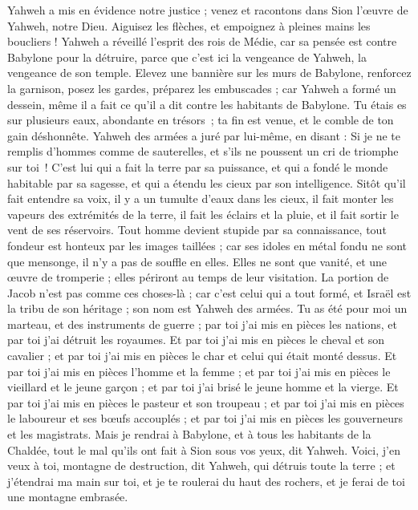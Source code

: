 \begin{multicols}{2}
Yahweh a mis en évidence notre justice ; venez et racontons dans Sion l’œuvre de Yahweh, notre Dieu.
Aiguisez les flèches, et empoignez à pleines mains les boucliers ! Yahweh a réveillé l'esprit des rois de Médie, car sa pensée est contre Babylone pour la détruire, parce que c'est ici la vengeance de Yahweh, la vengeance de son temple.
Elevez une bannière sur les murs de Babylone, renforcez la garnison, posez les gardes, préparez les embuscades ; car Yahweh a formé un dessein, même il a fait ce qu'il a dit contre les habitants de Babylone.
Tu étais es sur plusieurs eaux, abondante en trésors ; ta fin est venue, et le comble de ton gain déshonnête.
Yahweh des armées a juré par lui-même, en disant : Si je ne te remplis d'hommes comme de sauterelles, et s’ils ne poussent un cri de triomphe sur toi !
C'est lui qui a fait la terre par sa puissance, et qui a fondé le monde habitable par sa sagesse, et qui a étendu les cieux par son intelligence.
Sitôt qu'il fait entendre sa voix, il y a un tumulte d'eaux dans les cieux, il fait monter les vapeurs des extrémités de la terre, il fait les éclairs et la pluie, et il fait sortir le vent de ses réservoirs.
Tout homme devient stupide par sa connaissance, tout fondeur est honteux par les images taillées ; car ses idoles en métal fondu ne sont que mensonge, il n'y a pas de souffle en elles.
Elles ne sont que vanité, et une œuvre de tromperie ; elles périront au temps de leur visitation.
La portion de Jacob n'est pas comme ces choses-là ; car c'est celui qui a tout formé, et Israël est la tribu de son héritage ; son nom est Yahweh des armées.
Tu as été pour moi un marteau, et des instruments de guerre ; par toi j'ai mis en pièces les nations, et par toi j'ai détruit les royaumes.
Et par toi j'ai mis en pièces le cheval et son cavalier ; et par toi j'ai mis en pièces le char et celui qui était monté dessus.
Et par toi j'ai mis en pièces l'homme et la femme ; et par toi j'ai mis en pièces le vieillard et le jeune garçon ; et par toi j'ai brisé le jeune homme et la vierge.
Et par toi j'ai mis en pièces le pasteur et son troupeau ; et par toi j'ai mis en pièces le laboureur et ses bœufs accouplés ; et par toi j'ai mis en pièces les gouverneurs et les magistrats.
Mais je rendrai à Babylone, et à tous les habitants de la Chaldée, tout le mal qu'ils ont fait à Sion sous vos yeux, dit Yahweh.
Voici, j'en veux à toi, montagne de destruction, dit Yahweh, qui détruis toute la terre ; et j'étendrai ma main sur toi, et je te roulerai du haut des rochers, et je ferai de toi une montagne embrasée.

\end{multicols}
